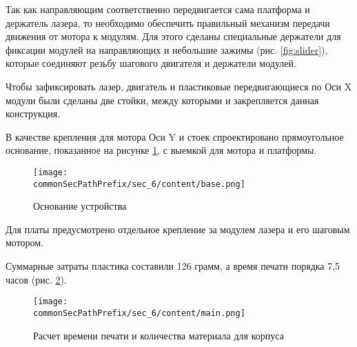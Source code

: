 Так как направляющим соответственно передвигается сама платформа и держатель лазера, то необходимо обеспечить правильный 
механизм передачи движения от мотора к модулям. Для этого сделаны специальные держатели  
для фиксации модулей на направляющих и небольшие зажимы (рис. \ref{fig:slider}), которые соединяют резьбу шагового двигателя и держатели модулей. 

Чтобы зафиксировать лазер, двигатель и пластиковые передвигающиеся по Оси X модули были сделаны две стойки, 
между которыми и закрепляется данная конструкция. 

В качестве крепления для мотора Оси Y и стоек спроектировано прямоугольное основание, показанное на рисунке \ref{fig:base},
с выемкой для мотора и платформы.

\begin{figure}[ht]
    \centering
    \texttt{[image: \\commonSecPathPrefix/sec\_6/content/base.png]}
    \caption{Основание устройства}
    \label{fig:base}
\end{figure}

Для платы предусмотрено отдельное крепление за модулем лазера и его шаговым мотором.

Суммарные затраты пластика составили 126 грамм, а время печати порядка 7,5 часов (рис. \ref{fig:frame}).

\begin{figure}[ht]
    \centering
    \texttt{[image: \\commonSecPathPrefix/sec\_6/content/main.png]}
    \caption{Расчет времени печати и количества материала для корпуса}
    \label{fig:frame}
\end{figure}
